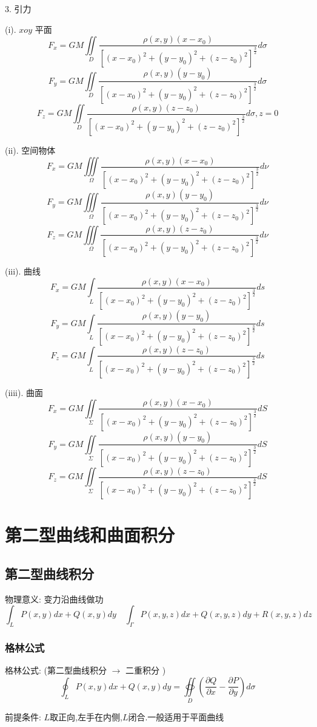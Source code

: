 3. 引力
\begin{definition}[引力公式: $F=\frac{GMm}{r^2}$]
	
	(i). $xoy$ 平面
	$$F_{x}=GM\iint\limits_{D}\frac{\rho(x,y)(x-x_{0})}{[(x-x_{0})^2+(y-y_{0})^2+(z-z_{0})^2]^{\frac{3}{2}}}d\sigma$$
	$$F_{y}=GM\iint\limits_{D}\frac{\rho(x,y)(y-y_{0})}{[(x-x_{0})^2+(y-y_{0})^2+(z-z_{0})^2]^{\frac{3}{2}}}d\sigma$$
	$$F_{z}=GM\iint\limits_{D}\frac{\rho(x,y)(z-z_{0})}{[(x-x_{0})^2+(y-y_{0})^2+(z-z_{0})^2]^{\frac{3}{2}}}d\sigma,z=0$$
	
	(ii). 空间物体
	$$F_{x}=GM\iiint\limits_{\Omega}\frac{\rho(x,y)(x-x_{0})}{[(x-x_{0})^2+(y-y_{0})^2+(z-z_{0})^2]^{\frac{3}{2}}}d\nu$$
	$$F_{y}=GM\iiint\limits_{\Omega}\frac{\rho(x,y)(y-y_{0})}{[(x-x_{0})^2+(y-y_{0})^2+(z-z_{0})^2]^{\frac{3}{2}}}d\nu$$
	$$F_{z}=GM\iiint\limits_{\Omega}\frac{\rho(x,y)(z-z_{0})}{[(x-x_{0})^2+(y-y_{0})^2+(z-z_{0})^2]^{\frac{3}{2}}}d\nu$$
	
	(iii). 曲线
	$$F_{x}=GM\int\limits_{L}\frac{\rho(x,y)(x-x_{0})}{[(x-x_{0})^2+(y-y_{0})^2+(z-z_{0})^2]^{\frac{3}{2}}}ds$$
	$$F_{y}=GM\int\limits_{L}\frac{\rho(x,y)(y-y_{0})}{[(x-x_{0})^2+(y-y_{0})^2+(z-z_{0})^2]^{\frac{3}{2}}}ds$$
	$$F_{z}=GM\int\limits_{L}\frac{\rho(x,y)(z-z_{0})}{[(x-x_{0})^2+(y-y_{0})^2+(z-z_{0})^2]^{\frac{3}{2}}}ds$$
	
	(iiii). 曲面
	$$F_{x}=GM\iint\limits_{\Sigma}\frac{\rho(x,y)(x-x_{0})}{[(x-x_{0})^2+(y-y_{0})^2+(z-z_{0})^2]^{\frac{3}{2}}}dS$$
	$$F_{y}=GM\iint\limits_{\Sigma}\frac{\rho(x,y)(y-y_{0})}{[(x-x_{0})^2+(y-y_{0})^2+(z-z_{0})^2]^{\frac{3}{2}}}dS$$
	$$F_{z}=GM\iint\limits_{\Sigma}\frac{\rho(x,y)(z-z_{0})}{[(x-x_{0})^2+(y-y_{0})^2+(z-z_{0})^2]^{\frac{3}{2}}}dS$$
\end{definition}

\chapter{第二型曲线和曲面积分}
\section{第二型曲线积分}
\begin{definition}[第二型曲线积分]
	物理意义: 变力沿曲线做功
	$$\int_{L}P(x,y)dx+Q(x,y)dy \quad \int_{\Gamma}P(x,y,z)dx+Q(x,y,z)dy+R(x,y,z)dz$$
\end{definition}
\subsection{格林公式}
\begin{theorem}
	格林公式: (第二型曲线积分 $\rightarrow$ 二重积分 )
	$$\oint_{L}P(x,y)dx+Q(x,y)dy=\oiint\limits_{D}(\frac{\partial Q}{\partial x}-\frac{\partial P}{\partial y})d\sigma$$
	
	前提条件: $L$取正向,左手在内侧,$L$闭合.一般适用于平面曲线
\end{theorem}
